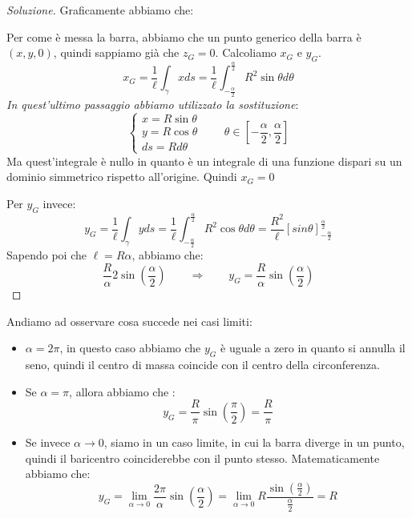\documentclass[11pt,a4paper,twoside]{article}
\theoremstyle{definition}
\newenvironment{sol}
	{\renewcommand\qedsymbol{$\blacksquare$}\begin{proof}[Soluzione]}
	{\end{proof}}
\begin{document}
\begin{sol}
	Graficamente abbiamo che:
	\begin{center}
	\end{center}
	Per come è messa la barra, abbiamo che un punto generico della barra è $(x,y,0)$, quindi sappiamo già che $z_G = 0$. Calcoliamo $x_G$ e $y_G$.
	\[ x_G = \frac 1 \ell \int_\gamma x ds = \frac 1 \ell \int_{-\frac \alpha 2}^{\frac \alpha 2} R^2 \sin \theta d \theta \]
	\textit{In quest'ultimo passaggio abbiamo utilizzato la sostituzione}:
	\[ \begin{cases}
		x = R \sin \theta\\
		y = R \cos \theta\\
		ds = Rd\theta
	\end{cases}\qquad \theta \in \left[-\frac \alpha 2, \frac \alpha 2\right]\]
	Ma quest'integrale è nullo in quanto è un integrale di una funzione dispari su un dominio simmetrico rispetto all'origine. Quindi $x_G = 0$

	Per $y_G$ invece:
	\[ y_G = \frac 1 \ell \int_\gamma y ds = \frac 1\ell \int_{-\frac \alpha 2}^{\frac \alpha 2} R^2 \cos \theta d\theta = \frac {R^2} \ell [sin\theta]_{-\frac \alpha 2}^{\frac \alpha 2}\]
	Sapendo poi che $\ell = R\alpha$, abbiamo che:
	\[ \frac R\alpha 2 \sin \left(\frac \alpha 2\right) \qquad \Rightarrow \qquad y_G = \frac R\alpha \sin \left( \frac \alpha 2 \right)\]
\end{sol}

Andiamo ad osservare cosa succede nei casi limiti:
\begin{itemize}
	\item $\alpha = 2 \pi$, in questo caso abbiamo che $y_G$ è uguale a zero in quanto si annulla il seno, quindi il centro di massa coincide con il centro della circonferenza.
	\item Se $\alpha = \pi$, allora abbiamo che :
		\[ y_G = \frac R \pi \sin \left(\frac \pi 2\right) = \frac R \pi\]
	\item Se invece $\alpha \to 0$, siamo in un caso limite, in cui la barra diverge in un punto, quindi il baricentro coinciderebbe con il punto stesso. Matematicamente abbiamo che:
		\[y_G = \lim_{\alpha \to 0}\frac{2\pi}{\alpha} \sin(\frac\alpha 2) = \lim_{\alpha \to 0} R \frac{\sin (\frac \alpha 2)}{\frac \alpha 2} = R\]
\end{itemize}
\end{document}
